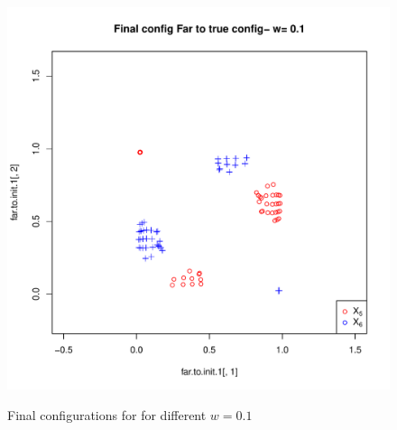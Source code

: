 \documentclass[12pt,oneside,final]{thesis}\usepackage[]{graphicx}\usepackage[]{color}
\begin{document}
\begin{figure}
\begin{minipage}[b]{0.5\linewidth}
\label{fig:Finalconfig-MultMin-w-0_1_a}
\end{minipage}
\hspace{0.5cm}
\begin{minipage}[b]{0.5\linewidth}
\centering
\includegraphics[scale=0.45]{other-min-w-0_1.pdf}

\label{fig:Finalconfig-MultMin-w-0_1_b}
\end{minipage}

\caption{Final configurations for for different $w=0.1$ }
\label{fig:Finalconfig-MultMin-w-0_1}


\end{figure}
\end{document}
